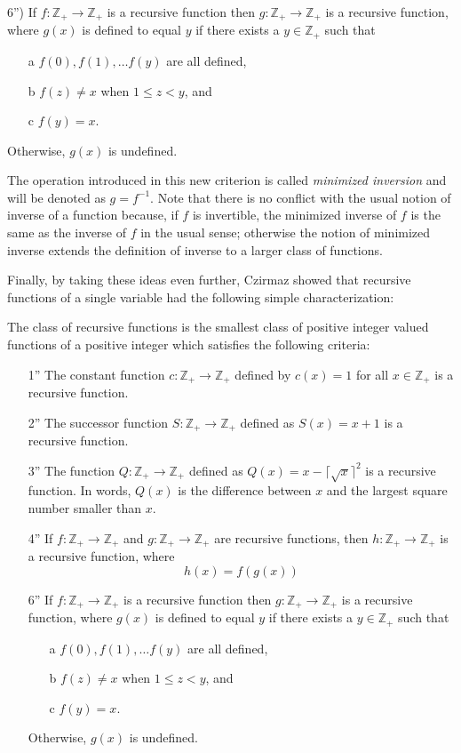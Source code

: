 \documentclass[12pt]{article}
\begin{document}
6'') If $f \colon \mathbb{Z}_+ \to \mathbb{Z}_+$ is a recursive function then $g \colon \mathbb{Z}_+ \to \mathbb{Z}_+$ is a recursive function, where $g(x)$ is defined to equal $y$  if there exists a $y \in \mathbb{Z}_+$ such that 
\begin{enumerate}
\item[a] $f(0), f(1), \ldots f(y)$ are all defined, 
\item[b] $f(z) \ne x$ when $1 \le z <y$, and 
\item[c] $f(y) = x$.
\end{enumerate}
Otherwise, $g(x)$ is undefined.

The operation introduced in this new criterion is called \emph{minimized inversion} and will be denoted as $g = f^{-1}$.  Note that there is no conflict with the usual notion of inverse of a function because, if $f$ is invertible, the minimized inverse of $f$ is the same as the inverse of $f$ in the usual sense; otherwise the notion of minimized inverse extends the definition of inverse to a larger class of functions.

Finally, by taking these ideas even further, Czirmaz showed that recursive functions of a single variable had the following simple characterization:

The class of recursive functions is the smallest class of positive integer valued functions of a positive integer which satisfies the following criteria:
\begin{enumerate}
\item[1''] The constant function $c: \mathbb{Z}_+ \to \mathbb{Z}_+$ defined by $c(x) = 1$ for all $x \in \mathbb{Z}_+$ is a recursive function.
\item[2'']  The successor function $S \colon \mathbb{Z}_+ \to \mathbb{Z}_+$ defined as $S(x) = x+1$ is a recursive function.
\item[3'']  The function $Q \colon \mathbb{Z}_+ \to \mathbb{Z}_+$ defined as $Q(x) = x - \lceil \sqrt{x} \rceil^2$ is a recursive function.  In words, $Q(x)$ is the difference between $x$ and the largest square number smaller than $x$.
\item[4'']  If $f \colon \mathbb{Z}_+ \to \mathbb{Z}_+$ and $g \colon \mathbb{Z}_+ \to \mathbb{Z}_+$ are recursive functions, then $h \colon \mathbb{Z}_+ \to \mathbb{Z}_+$ is a recursive function, where
 $$h(x) = f(g(x))$$
\item[6''] If $f \colon \mathbb{Z}_+ \to \mathbb{Z}_+$ is a recursive function then $g \colon \mathbb{Z}_+ \to \mathbb{Z}_+$ is a recursive function, where $g(x)$ is defined to equal $y$  if there exists a $y \in \mathbb{Z}_+$ such that \begin{enumerate}
\item[a] $f(0), f(1), \ldots f(y)$ are all defined, 
\item[b] $f(z) \ne x$ when $1 \le z <y$, and 
\item[c] $f(y) = x$.
\end{enumerate}
Otherwise, $g(x)$ is undefined.
\end{enumerate}
\end{document}
